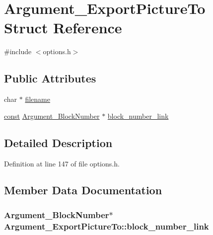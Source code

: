 \hypertarget{struct_argument___export_picture_to}{}\section{Argument\+\_\+\+Export\+Picture\+To Struct Reference}
\label{struct_argument___export_picture_to}


{\ttfamily \#include $<$options.\+h$>$}

\subsection*{Public Attributes}
\begin{DoxyCompactItemize}
\item 
char $\ast$ \hyperlink{struct_argument___export_picture_to_ab895082d0b2b58146212c111f29f4bd8}{filename}
\item 
\hyperlink{getopt1_8c_a2c212835823e3c54a8ab6d95c652660e}{const} \hyperlink{struct_argument___block_number}{Argument\+\_\+\+Block\+Number} $\ast$ \hyperlink{struct_argument___export_picture_to_a554f1335ec0277bf51b50b0832b6869e}{block\+\_\+number\+\_\+link}
\end{DoxyCompactItemize}


\subsection{Detailed Description}


Definition at line 147 of file options.\+h.



\subsection{Member Data Documentation}
\subsubsection[{\texorpdfstring{block\+\_\+number\+\_\+link}{block_number_link}}]{ {\bf Argument\+\_\+\+Block\+Number}$\ast$ Argument\+\_\+\+Export\+Picture\+To\+::block\+\_\+number\+\_\+link}\hypertarget{struct_argument___export_picture_to_a554f1335ec0277bf51b50b0832b6869e}{}\label{struct_argument___export_picture_to_a554f1335ec0277bf51b50b0832b6869e}


